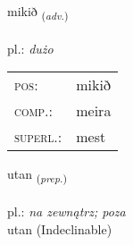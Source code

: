 \documentclass[frontgrid, backgrid]{flacards}\usepackage[]{graphicx}\usepackage[]{xcolor}
\begin{document}
\renewcommand{\flhead}{\vskip5pt \fboxsep=0pt {\small\bfseries\footnotesize Atviksorð | Adverb}}
\renewcommand{\fcfoot}{\vskip5pt \fboxsep=0pt \hspace{2pt}{\small\bfseries\footnotesize 1K}}

\renewcommand{\blhead}{\vskip5pt {\small\bfseries\footnotesize Atviksorð | Adverb }}
\renewcommand{\bcfoot}{\vskip5pt \hspace{2pt}{\small\bfseries\footnotesize 1K}}


{mikið \small{\textsubscript{(\textit{adv.})}} \\[1ex] %
\textphonetic{[mɪːcɪð]} \\
pl.: \emph{dużo} \\  [2ex]
\renewcommand*{\arraystretch}{0.8}
\begin{tabular}{ll}
\textsc{pos}: & mikið \\ 
\textsc{comp.}: & meira \\ 
\textsc{superl.}: & mest \\
\end{tabular}
}


\renewcommand{\flhead}{\vskip5pt \fboxsep=0pt {\small\bfseries\footnotesize Forsetning | Preposition}}
\renewcommand{\fcfoot}{\vskip5pt \fboxsep=0pt \hspace{2pt}{\small\bfseries\footnotesize 1K}}

\renewcommand{\blhead}{\vskip5pt {\small\bfseries\footnotesize Forsetning | Preposition }}
\renewcommand{\bcfoot}{\vskip5pt \hspace{2pt}{\small\bfseries\footnotesize 1K}}


{utan \small{\textsubscript{(\textit{prep.})}} \\[1ex]
\textphonetic{[ʏːtan]} \\
pl.: \emph{na zewnątrz; poza} \\  [2ex]
utan (Indeclinable)}

\renewcommand{\flhead}{\vskip5pt \fboxsep=0pt {\small\bfseries\footnotesize Nafnorð | Noun}}
\renewcommand{\fcfoot}{\vskip5pt \fboxsep=0pt \hspace{2pt}{\small\bfseries\footnotesize 1K}}
\end{document}

